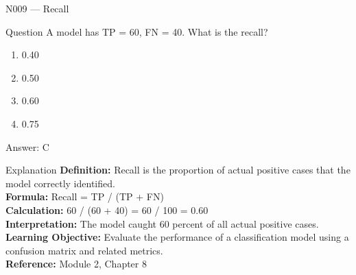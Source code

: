 \documentclass[aspectratio=169,8pt]{beamer}
\begin{document}
	\begin{frame}{N009 --- Recall}
		\begin{block}{Question}
			A model has TP = 60, FN = 40. What is the recall?
			\begin{enumerate}
				\item 0.40
				\item 0.50
				\item 0.60
				\item 0.75
			\end{enumerate}
		\end{block}
		\begin{exampleblock}{Answer: C}\end{exampleblock}
		\begin{block}{Explanation}
			\textbf{Definition:} Recall is the proportion of actual positive cases that the model correctly identified.\\
			\textbf{Formula:} Recall = TP / (TP + FN)\\
			\textbf{Calculation:} 60 / (60 + 40) = 60 / 100 = 0.60\\
			\textbf{Interpretation:} The model caught 60 percent of all actual positive cases.\\
			\textbf{Learning Objective:} Evaluate the performance of a classification model using a confusion matrix and related metrics.\\
			\textbf{Reference:} Module 2, Chapter 8
		\end{block}
	\end{frame}
	
\end{document}

